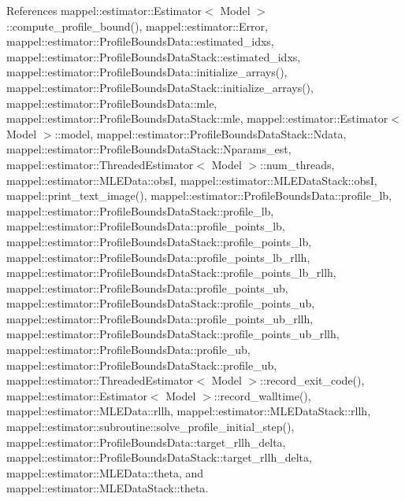 References mappel\+::estimator\+::\+Estimator$<$ Model $>$\+::compute\+\_\+profile\+\_\+bound(), mappel\+::estimator\+::\+Error, mappel\+::estimator\+::\+Profile\+Bounds\+Data\+::estimated\+\_\+idxs, mappel\+::estimator\+::\+Profile\+Bounds\+Data\+Stack\+::estimated\+\_\+idxs, mappel\+::estimator\+::\+Profile\+Bounds\+Data\+::initialize\+\_\+arrays(), mappel\+::estimator\+::\+Profile\+Bounds\+Data\+Stack\+::initialize\+\_\+arrays(), mappel\+::estimator\+::\+Profile\+Bounds\+Data\+::mle, mappel\+::estimator\+::\+Profile\+Bounds\+Data\+Stack\+::mle, mappel\+::estimator\+::\+Estimator$<$ Model $>$\+::model, mappel\+::estimator\+::\+Profile\+Bounds\+Data\+Stack\+::\+Ndata, mappel\+::estimator\+::\+Profile\+Bounds\+Data\+Stack\+::\+Nparams\+\_\+est, mappel\+::estimator\+::\+Threaded\+Estimator$<$ Model $>$\+::num\+\_\+threads, mappel\+::estimator\+::\+M\+L\+E\+Data\+::obsI, mappel\+::estimator\+::\+M\+L\+E\+Data\+Stack\+::obsI, mappel\+::print\+\_\+text\+\_\+image(), mappel\+::estimator\+::\+Profile\+Bounds\+Data\+::profile\+\_\+lb, mappel\+::estimator\+::\+Profile\+Bounds\+Data\+Stack\+::profile\+\_\+lb, mappel\+::estimator\+::\+Profile\+Bounds\+Data\+::profile\+\_\+points\+\_\+lb, mappel\+::estimator\+::\+Profile\+Bounds\+Data\+Stack\+::profile\+\_\+points\+\_\+lb, mappel\+::estimator\+::\+Profile\+Bounds\+Data\+::profile\+\_\+points\+\_\+lb\+\_\+rllh, mappel\+::estimator\+::\+Profile\+Bounds\+Data\+Stack\+::profile\+\_\+points\+\_\+lb\+\_\+rllh, mappel\+::estimator\+::\+Profile\+Bounds\+Data\+::profile\+\_\+points\+\_\+ub, mappel\+::estimator\+::\+Profile\+Bounds\+Data\+Stack\+::profile\+\_\+points\+\_\+ub, mappel\+::estimator\+::\+Profile\+Bounds\+Data\+::profile\+\_\+points\+\_\+ub\+\_\+rllh, mappel\+::estimator\+::\+Profile\+Bounds\+Data\+Stack\+::profile\+\_\+points\+\_\+ub\+\_\+rllh, mappel\+::estimator\+::\+Profile\+Bounds\+Data\+::profile\+\_\+ub, mappel\+::estimator\+::\+Profile\+Bounds\+Data\+Stack\+::profile\+\_\+ub, mappel\+::estimator\+::\+Threaded\+Estimator$<$ Model $>$\+::record\+\_\+exit\+\_\+code(), mappel\+::estimator\+::\+Estimator$<$ Model $>$\+::record\+\_\+walltime(), mappel\+::estimator\+::\+M\+L\+E\+Data\+::rllh, mappel\+::estimator\+::\+M\+L\+E\+Data\+Stack\+::rllh, mappel\+::estimator\+::subroutine\+::solve\+\_\+profile\+\_\+initial\+\_\+step(), mappel\+::estimator\+::\+Profile\+Bounds\+Data\+::target\+\_\+rllh\+\_\+delta, mappel\+::estimator\+::\+Profile\+Bounds\+Data\+Stack\+::target\+\_\+rllh\+\_\+delta, mappel\+::estimator\+::\+M\+L\+E\+Data\+::theta, and mappel\+::estimator\+::\+M\+L\+E\+Data\+Stack\+::theta.



